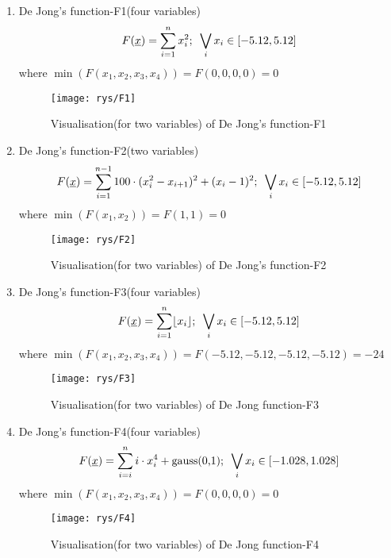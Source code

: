 \begin{enumerate}
\item De Jong's function-F1(four variables)
	\begin{equation}
		F(\underline{x})=\sum_{i=1}^n x^2_i; \textnormal{  } \bigvee_i x_i \in
		[-5.12, 5.12]
		\label{dj1}
	\end{equation}
	where $\min(F(x_1,x_2,x_3,x_4))=F(0,0,0,0)=0$
	\nopagebreak
	\begin{figure}[!htpb]
		\begin{center}
			\texttt{[image: rys/F1]}
		\end{center}
		\caption{Visualisation(for two variables) of De Jong's function-F1}
		\label{fig:F1}
	\end{figure}
\item De Jong's function-F2(two variables)
	\begin{equation}
		F(\underline{x})=\sum_{i=1}^{n-1}100\cdot(x_i^2-x_{i+1})^2+(x_i-1)^2;
		\textnormal{  } \bigvee_i x_i \in [-5.12,5.12]
		\label{dj2}
	\end{equation}
	where $\min(F(x_1, x_2))=F(1,1)=0$
	\pagebreak
	\begin{figure}[!htpb]
		\begin{center}
			\texttt{[image: rys/F2]}
		\end{center}
		\caption{Visualisation(for two variables) of De Jong's function-F2}
		\label{fig:F2}
	\end{figure}
\item De Jong's function-F3(four variables)
	\begin{equation}
		F(\underline{x})=\sum_{i=1}^n\lfloor x_i \rfloor ; \textnormal{  }
		\bigvee_i x_i \in [-5.12,5.12]
		\label{dj3}
	\end{equation}
	where $\min(F(x_1,x_2,x_3,x_4))=F(-5.12, -5.12, -5.12, -5.12)=-24$
	\nopagebreak
	\begin{figure}[!h]
		\begin{center}
			\texttt{[image: rys/F3]}
		\end{center}
		\caption{Visualisation(for two variables) of De Jong function-F3}
		\label{fig:F3}
	\end{figure}
\item De Jong's function-F4(four variables)
	\begin{equation}
		F(\underline{x})=\sum_{i=i}^n i\cdot x_i^4+\textnormal{gauss(0,1)}; \textnormal{  }
		\bigvee_i x_i \in [-1.028, 1.028]
		\label{dj4}
	\end{equation}
	where $\min(F(x_1, x_2, x_3, x_4))=F(0, 0, 0, 0)=0$
	\nopagebreak
	\begin{figure}[!htpb]
		\begin{center}
			\texttt{[image: rys/F4]}
		\end{center}
		\caption{Visualisation(for two variables) of De Jong function-F4}
		\label{fig:F4}
	\end{figure}


\end{enumerate}
